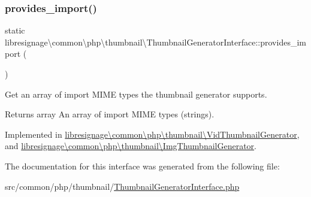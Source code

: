 \subsubsection{\texorpdfstring{provides\+\_\+import()}{provides\_import()}}
{\footnotesize\ttfamily static libresignage\textbackslash{}common\textbackslash{}php\textbackslash{}thumbnail\textbackslash{}\+Thumbnail\+Generator\+Interface\+::provides\+\_\+import (\begin{DoxyParamCaption}{ }\end{DoxyParamCaption})\hspace{0.3cm}{\ttfamily [static]}}

Get an array of import M\+I\+ME types the thumbnail generator supports.

\begin{DoxyReturn}{Returns}
array An array of import M\+I\+ME types (strings). 
\end{DoxyReturn}


Implemented in \hyperlink{classlibresignage_1_1common_1_1php_1_1thumbnail_1_1VidThumbnailGenerator_ac425e90b4944a08c887d99d5cc72f3ff}{libresignage\textbackslash{}common\textbackslash{}php\textbackslash{}thumbnail\textbackslash{}\+Vid\+Thumbnail\+Generator}, and \hyperlink{classlibresignage_1_1common_1_1php_1_1thumbnail_1_1ImgThumbnailGenerator_a3fc7c9aedf448fcc6959ce18ffca35cb}{libresignage\textbackslash{}common\textbackslash{}php\textbackslash{}thumbnail\textbackslash{}\+Img\+Thumbnail\+Generator}.



The documentation for this interface was generated from the following file\+:\begin{DoxyCompactItemize}
\item 
src/common/php/thumbnail/\hyperlink{ThumbnailGeneratorInterface_8php}{Thumbnail\+Generator\+Interface.\+php}\end{DoxyCompactItemize}
